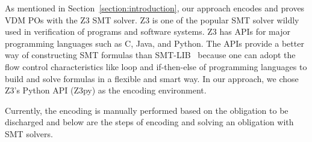 
As mentioned in Section~\ref{section:introduction}, our approach encodes and proves VDM POs with the Z3 SMT solver. Z3 is one of the popular SMT solver wildly used in verification of programs and software systems. Z3 has APIs for major programming languages such as C, Java, and Python. The APIs provide a better way of constructing SMT formulas than SMT-LIB~\cite{BarFT-SMTLIB} because one can adopt the flow control characteristics like loop and if-then-else of programming languages to build and solve formulas in a flexible and smart way. In our approach, we chose Z3's Python API (Z3py) as the encoding environment. 

Currently, the encoding is manually performed based on the obligation to be discharged and below are the steps of encoding and solving an obligation with SMT solvers.


